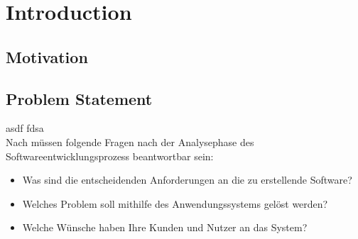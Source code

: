 \chapter{Introduction}
\label{Introduction}

	\section{Motivation}
	\label{Introduction:Motivation}
	
	\section{Problem Statement}
	\label{Introduction:Problem Statement}
	asdf fdsa\\
	Nach \cite[S. 169]{Krypczyk2018} müssen folgende Fragen nach der Analysephase des Softwareentwicklungsprozess beantwortbar sein:
	\begin{itemize}
		\item Was sind die entscheidenden Anforderungen an die zu erstellende Software?
		\item Welches Problem soll mithilfe des Anwendungssystems gelöst werden?
		\item Welche Wünsche haben Ihre Kunden und Nutzer an das System?
	\end{itemize}
	